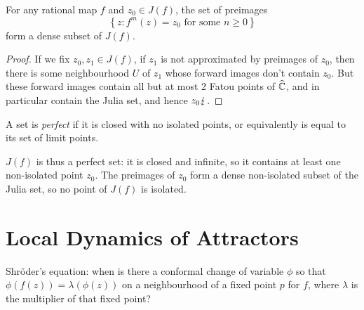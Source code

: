 \documentclass[10pt,a4paper]{article}
\begin{document}
\begin{corollary}
  For any rational map $f$ and $z_0 \in J(f)$, the set of preimages
  \[ \left\{ z: f^m(z) = z_0 \text{ for some } n\geq 0\right\}\]
  form a dense subset of $J(f)$.
\end{corollary}
\begin{proof}
  If we fix $z_0, z_1 \in J(f)$, if $z_1$ is not approximated by preimages of $z_0$, then there is some neighbourhood $U$ of $z_1$ whose forward images don't contain $z_0$. But these forward images contain all but at most 2 Fatou points of $\widehat{\mathbb{C}}$, and in particular contain the Julia set, and hence $z_0\lightning$.
\end{proof}
\begin{definition}
  A set is \emph{perfect} if it is closed with no isolated points, or equivalently is equal to its set of limit points.
\end{definition}
$J(f)$ is thus a perfect set: it is closed and infinite, so it contains at least one non-isolated point $z_0$. The preimages of $z_0$ form a dense non-isolated subset of the Julia set, so no point of $J(f)$ is isolated.

\section{Local Dynamics of Attractors}
Shr\"oder's equation: when is there a conformal change of variable $\phi$ so that $\phi(f(z)) = \lambda(\phi(z))$ on a neighbourhood of a fixed point $p$ for $f$, where $\lambda$ is the multiplier of that fixed point?
\end{document}
